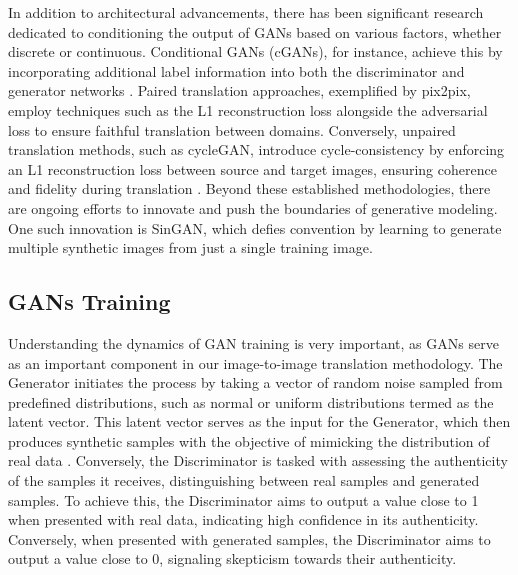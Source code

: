 \documentclass[UKenglish,12pt]{master-style}
\begin{document}
In addition to architectural advancements, there has been significant research dedicated to conditioning the output of GANs based on various factors, whether discrete or continuous. Conditional GANs (cGANs), for instance, achieve this by incorporating additional label information into both the discriminator and generator networks\cite{GAN} .
Paired translation approaches, exemplified by pix2pix, employ techniques such as the L1 reconstruction loss alongside the adversarial loss to ensure faithful translation between domains. Conversely, unpaired translation methods, such as cycleGAN, introduce cycle-consistency by enforcing an L1 reconstruction loss between source and target images, ensuring coherence and fidelity during translation \cite{parmar2024onestep}. Beyond these established methodologies, there are ongoing efforts to innovate and push the boundaries of generative modeling. One such innovation is SinGAN, which defies convention by learning to generate multiple synthetic images from just a single training image\cite{syngan}.

\subsection{GANs Training}

Understanding the dynamics of GAN training is very important, as GANs serve as an important component in our image-to-image translation methodology. The Generator initiates the process by taking a vector of random noise sampled from predefined distributions, such as normal or uniform distributions termed as the latent vector. This latent vector serves as the input for the Generator, which then produces synthetic samples  with the objective of mimicking the distribution of real data \cite{8784681} . Conversely, the Discriminator is tasked with assessing the authenticity of the samples it receives, distinguishing between real samples and generated samples. To achieve this, the Discriminator aims to output a value close to 1 when presented with real data, indicating high confidence in its authenticity. Conversely, when presented with generated samples, the Discriminator aims to output a value close to 0, signaling skepticism towards their authenticity.
\end{document}
